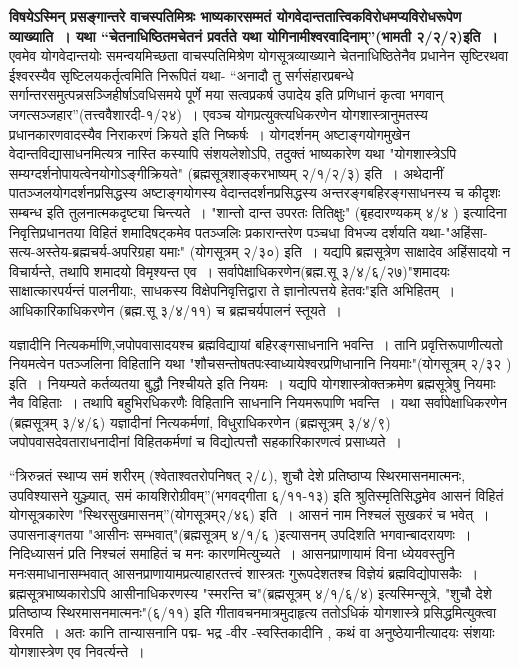 {\textbf{विषयेऽस्मिन् प्रसङ्गान्तरे वाचस्पतिमिश्रः भाष्यकारसम्मतं योगवेदान्ततात्त्विकविरोधमप्यविरोधरूपेण व्याख्याति~। यथा “चेतनाधिष्ठितमचेतनं प्रवर्तते यथा योगिनामीश्वरवादिनाम्”(भामती २/२/२)इति~। } एवमेव योगवेदान्तयोः समन्वयमिच्छता वाचस्पतिमिश्रेण योगसूत्रव्याख्याने चेतनाधिष्ठितेनैव प्रधानेन सृष्टिरथवा ईश्वरस्यैव सृष्टिलयकर्तृत्वमिति निरूपितं यथा- “अनादौ तु सर्गसंहारप्रबन्धे सर्गान्तरसमुत्पन्नसञ्जिहीर्षाऽवधिसमये पूर्णे मया सत्वप्रकर्ष उपादेय इति प्रणिधानं कृत्वा भगवान् जगत्सञ्जहार”(तत्त्ववैशारदी-१/२४)~। एवञ्च योगप्रत्युक्त्यधिकरणेन योगशास्त्रानुमतस्य प्रधानकारणवादस्यैव निराकरणं क्रियते इति निष्कर्षः~। योगदर्शनम् अष्टाङ्गयोगमुखेन वेदान्तविद्यासाधनमित्यत्र नास्ति कस्यापि संशयलेशोऽपि, तदुक्तं भाष्यकारेण यथा "योगशास्त्रेऽपि सम्यग्दर्शनोपायत्वेनयोगोऽङ्गीक्रियते" (ब्रह्मसूत्रशाङ्करभाष्यम् २/१/२/३) इति~। अथेदानीं पातञ्जलयोगदर्शनप्रसिद्धस्य अष्टाङ्गयोगस्य वेदान्तदर्शनप्रसिद्धस्य अन्तरङ्गबहिरङ्गसाधनस्य च कीदृशः सम्बन्ध इति तुलनात्मकदृष्ट्या चिन्त्यते~। "शान्तो दान्त उपरतः तितिक्षुः" (बृहदारण्यकम् ४/४ ) इत्यादिना निवृत्तिप्रधानतया विहितं शमादिषट्कमेव पतञ्जलिः प्रकारान्तरेण पञ्चधा विभज्य दर्शयति यथा-"अहिंसा-सत्य-अस्तेय-ब्रह्मचर्य-अपरिग्रहा यमाः" (योगसूत्रम् २/३०) इति~। यद्यपि ब्रह्मसूत्रेण साक्षादेव अहिंसादयो न विचार्यन्ते, तथापि शमादयो विमृश्यन्त एव~। सर्वापेक्षाधिकरणेन(ब्रह्म.सू ३/४/६/२७)"शमादयः साक्षात्कारपर्यन्तं पालनीयाः, साधकस्य विक्षेपनिवृत्तिद्वारा ते ज्ञानोत्पत्तये हेतवः"इति अभिहितम्~। आधिकारिकाधिकरणेन (ब्रह्म.सू ३/४/११) च ब्रह्मचर्यपालनं स्तूयते~। 

यज्ञादीनि नित्यकर्माणि,जपोपवासादयश्च ब्रह्मविद्यायां बहिरङ्गसाधनानि भवन्ति~। तानि प्रवृत्तिरूपाणीत्यतो नियमत्वेन पतञ्जलिना विहितानि यथा "शौचसन्तोषतपःस्वाध्यायेश्वरप्रणिधानानि नियमाः"(योगसूत्रम् २/३२ ) इति~। नियम्यते कर्तव्यतया बुद्धौ निश्चीयते इति नियमः~। यद्यपि योगशास्त्रोक्तक्रमेण ब्रह्मसूत्रेषु नियमाः नैव विहिताः~। तथापि बहुभिरधिकरणैः विहितानि साधनानि नियमरूपाणि भवन्ति~। यथा सर्वापेक्षाधिकरणेन (ब्रह्मसूत्रम् ३/४/६) यज्ञादीनां नित्यकर्मणां, विधुराधिकरणेन (ब्रह्मसूत्रम् ३/४/९) जपोपवासदेवताराधनादीनां विहितकर्मणां च विद्योत्पत्तौ सहकारिकारणत्वं प्रसाध्यते~। 

“त्रिरुन्नतं स्थाप्य समं शरीरम् (श्वेताश्वतरोपनिषत् २/८), शुचौ देशे प्रतिष्ठाप्य स्थिरमासनमात्मनः, उपविश्यासने युञ्ज्यात्, समं कायशिरोग्रीवम्”(भगवद्गीता ६/११-१३) इति श्रुतिस्मृतिसिद्धमेव आसनं विहितं योगसूत्रकारेण "स्थिरसुखमासनम्”(योगसूत्रम्२/४६) \break इति~। आसनं नाम निश्चलं सुखकरं च भवेत्~। उपासनाङ्गतया "आसीनः सम्भवात्"(ब्रह्मसूत्रम् ४/१/६ )इत्यासनम् उपदिशति भगवान्बादरायणः~। निदिध्यासनं प्रति निश्चलं समाहितं च मनः कारणमित्युच्यते~। आसनप्राणायामं विना ध्येयवस्तुनि मनःसमाधानासम्भवात् आसनप्राणायामप्रत्याहारतत्त्वं शास्त्रतः गुरूपदेशतश्च विज्ञेयं ब्रह्मविद्योपासकैः~। ब्रह्मसूत्रभाष्यकारोऽपि आसीनाधिकरणस्य "स्मरन्ति च"(ब्रह्मसूत्रम् ४/१/६/४) इत्यस्मिन्सूत्रे, "शुचौ देशे प्रतिष्ठाप्य स्थिरमासनमात्मनः"(६/११) इति गीतावचनमात्रमुदाहृत्य ततोऽधिकं योगशास्त्रे प्रसिद्धमित्युक्त्वा विरमति~। अतः कानि तान्यासनानि पद्म- भद्र -वीर -स्वस्तिकादीनि , कथं वा अनुष्ठेयानीत्यादयः संशयाः योगशास्त्रेण एव निवर्त्यन्ते~। 

}
